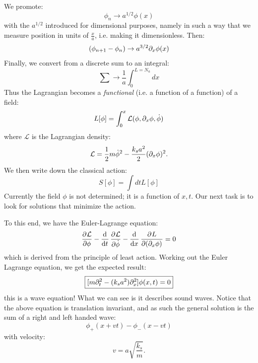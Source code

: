 We promote:
\begin{equation}
    \phi_n \to a^{1/2}\phi(x)
\end{equation}
with the $a^{1/2}$ introduced for dimensional purposes, namely in such a way that we measure position in units of $\frac{x}{a}$, i.e. making it dimensionless. Then:
\begin{equation}
    (\phi_{n+1} - \phi_n) \to a^{3/2}\partial_x \phi(x)
\end{equation}
Finally, we convert from a discrete sum to an integral:
\begin{equation}
    \sum \to \frac{1}{a}\int_0^{L=N_a}dx
\end{equation}
Thus the Lagrangian becomes a \emph{functional} (i.e. a function of a function) of a field:
\begin{equation}
    L[\phi] = \int_0^x \mathcal{L}(\phi, \partial_x\phi, \dot{\phi})
\end{equation}
where $\mathcal{L}$ is the Lagrangian density:
\begin{equation}
    \mathcal{L} = \frac{1}{2}m\dot{\phi}^2 - \frac{k_s a^2}{2}(\partial_x \phi)^2.
\end{equation}
We then write down the classical action:
\begin{equation}
    S[\phi] = \int dt L[\phi]
\end{equation}
Currently the field $\phi$ is not determined; it is a function of $x, t$. Our next task is to look for solutions that minimize the action.

To this end, we have the Euler-Lagrange equation:
\begin{equation}
    \dpd{\LL}{\phi} - \dod{}{t}\dpd{\LL}{\dot{\phi}} - \dod{}{x}\dpd{L}{(\p_x \phi)} = 0
\end{equation}
which is derived from the principle of least action. Working out the Euler Lagrange equation, we get the expected result:
\begin{equation}
    \boxed{[m\partial_t^2 - (k_s a^2)\partial_x^2]\phi(x, t) = 0}
\end{equation}
this is a wave equation! What we can see is it describes sound waves. Notice that the above equation is translation invariant, and as such the general solution is the sum of a right and left handed wave:
\begin{equation}
    \phi_+(x + vt) - \phi_-(x - vt)
\end{equation}
with velocity:
\begin{equation}
    v = a\sqrt{\frac{k_s}{m}}.
\end{equation}

